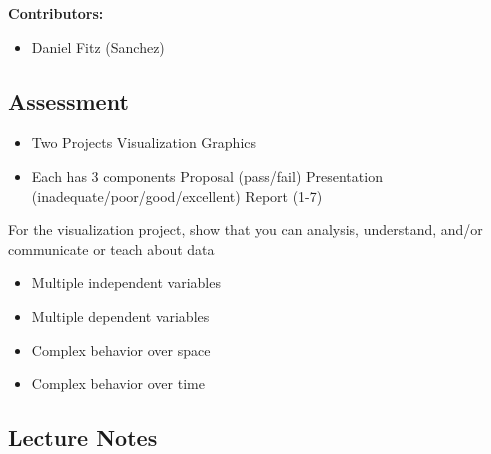 \documentclass[12pt, a4paper]{report}
\begin{document}
	\tableofcontents
	\vspace{2em}
	\textbf{Contributors:}
	\begin{itemize}
		\item Daniel Fitz (Sanchez)
	\end{itemize}
	\section{Assessment}
	\begin{itemize}
		\item Two Projects
		\subitem Visualization
		\subitem Graphics
		\item Each has 3 components
		\subitem Proposal (pass/fail)
		\subitem Presentation (inadequate/poor/good/excellent)
		\subitem Report (1-7)
	\end{itemize}
	For the visualization project, show that you can analysis, understand, and/or communicate or teach about data
	\begin{itemize}
		\item Multiple independent variables
		\item Multiple dependent variables
		\item Complex behavior over space
		\item Complex behavior over time
	\end{itemize}

	\newpage

\begin{multicols*}{2}

\chapter{Lecture Notes}



\end{multicols*}
\end{document}
